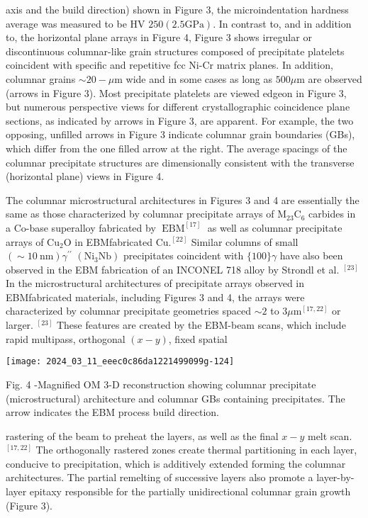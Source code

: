 \documentclass[10pt]{article}
\begin{document}
axis and the build direction) shown in Figure 3, the microindentation hardness average was measured to be HV $250(2.5 \mathrm{GPa})$. In contrast to, and in addition to, the horizontal plane arrays in Figure 4, Figure 3 shows irregular or discontinuous columnar-like grain structures composed of precipitate platelets coincident with specific and repetitive fcc Ni-Cr matrix planes. In addition, columnar grains $\sim 20-\mu \mathrm{m}$ wide and in some cases as long as $500 \mu \mathrm{m}$ are observed (arrows in Figure 3). Most precipitate platelets are viewed edgeon in Figure 3, but numerous perspective views for different crystallographic coincidence plane sections, as indicated by arrows in Figure 3, are apparent. For example, the two opposing, unfilled arrows in Figure 3 indicate columnar grain boundaries (GBs), which differ from the one filled arrow at the right. The average spacings of the columnar precipitate structures are dimensionally consistent with the transverse (horizontal plane) views in Figure 4.

The columnar microstructural architectures in Figures 3 and 4 are essentially the same as those characterized by columnar precipitate arrays of $\mathrm{M}_{23} \mathrm{C}_{6}$ carbides in a Co-base superalloy fabricated by $\operatorname{EBM}^{[17]}$ as well as columnar precipitate arrays of $\mathrm{Cu}_{2} \mathrm{O}$ in EBMfabricated $\mathrm{Cu} .{ }^{[22]}$ Similar columns of small $(\sim 10 \mathrm{~nm}) \gamma^{\prime \prime}$ $\left(\mathrm{Ni}_{3} \mathrm{Nb}\right)$ precipitates coincident with $\{100\} \gamma$ have also been observed in the EBM fabrication of an INCONEL 718 alloy by Strondl et al. ${ }^{[23]}$ In the microstructural architectures of precipitate arrays observed in EBMfabricated materials, including Figures 3 and 4, the arrays were characterized by columnar precipitate geometries spaced $\sim 2$ to $3 \mu \mathrm{m}^{[17,22]}$ or larger. ${ }^{[23]}$ These features are created by the EBM-beam scans, which include rapid multipass, orthogonal $(x-y)$, fixed spatial

\begin{center}
\texttt{[image: 2024\_03\_11\_eeec0c86da1221499099g-124]}
\end{center}

Fig. 4 -Magnified OM 3-D reconstruction showing columnar precipitate (microstructural) architecture and columnar GBs containing precipitates. The arrow indicates the EBM process build direction.

rastering of the beam to preheat the layers, as well as the final $x-y$ melt scan. ${ }^{[17,22]}$ The orthogonally rastered zones create thermal partitioning in each layer, conducive to precipitation, which is additively extended forming the columnar architectures. The partial remelting of successive layers also promote a layer-by-layer epitaxy responsible for the partially unidirectional columnar grain growth (Figure 3).
\end{document}
